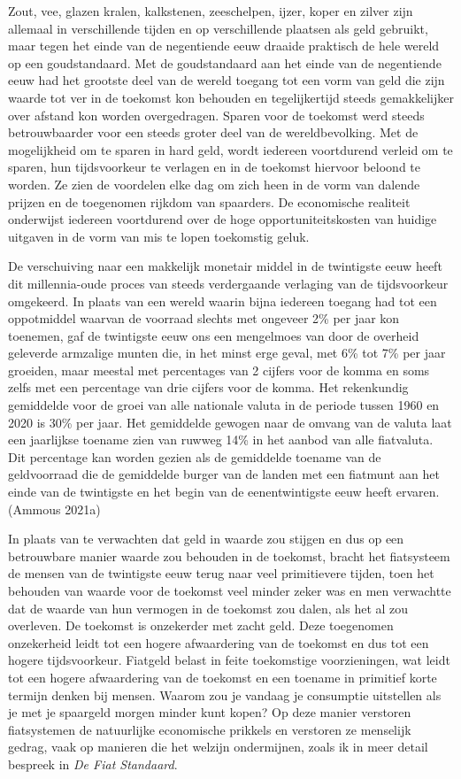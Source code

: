 \documentclass[
  a5paper,
  smalldemyvopaper,11pt,twoside,onecolumn,openright,extrafontsizes,
hidelinks]{memoir}
\begin{document}
Zout, vee, glazen kralen, kalkstenen, zeeschelpen, ijzer, koper en
zilver zijn allemaal in verschillende tijden en op verschillende
plaatsen als geld gebruikt, maar tegen het einde van de negentiende eeuw
draaide praktisch de hele wereld op een goudstandaard. Met de
goudstandaard aan het einde van de negentiende eeuw had het grootste
deel van de wereld toegang tot een vorm van geld die zijn waarde tot ver
in de toekomst kon behouden en tegelijkertijd steeds gemakkelijker over
afstand kon worden overgedragen. Sparen voor de toekomst werd steeds
betrouwbaarder voor een steeds groter deel van de wereldbevolking. Met
de mogelijkheid om te sparen in hard geld, wordt iedereen voortdurend
verleid om te sparen, hun tijdsvoorkeur te verlagen en in de toekomst
hiervoor beloond te worden. Ze zien de voordelen elke dag om zich heen
in de vorm van dalende prijzen en de toegenomen rijkdom van spaarders.
De economische realiteit onderwijst iedereen voortdurend over de hoge
opportuniteitskosten van huidige uitgaven in de vorm van mis te lopen
toekomstig geluk.

De verschuiving naar een makkelijk monetair middel in de twintigste eeuw
heeft dit millennia-oude proces van steeds verdergaande verlaging van de
tijdsvoorkeur omgekeerd. In plaats van een wereld waarin bijna iedereen
toegang had tot een oppotmiddel waarvan de voorraad slechts met ongeveer
2\% per jaar kon toenemen, gaf de twintigste eeuw ons een mengelmoes van
door de overheid geleverde armzalige munten die, in het minst erge
geval, met 6\% tot 7\% per jaar groeiden, maar meestal met percentages
van 2 cijfers voor de komma en soms zelfs met een percentage van drie
cijfers voor de komma. Het rekenkundig gemiddelde voor de groei van alle
nationale valuta in de periode tussen 1960 en 2020 is 30\% per jaar. Het
gemiddelde gewogen naar de omvang van de valuta laat een jaarlijkse
toename zien van ruwweg 14\% in het aanbod van alle fiatvaluta. Dit
percentage kan worden gezien als de gemiddelde toename van de
geldvoorraad die de gemiddelde burger van de landen met een fiatmunt aan
het einde van de twintigste en het begin van de eenentwintigste eeuw
heeft ervaren. (Ammous 2021a)

In plaats van te verwachten dat geld in waarde zou stijgen en dus op een
betrouwbare manier waarde zou behouden in de toekomst, bracht het
fiatsysteem de mensen van de twintigste eeuw terug naar veel
primitievere tijden, toen het behouden van waarde voor de toekomst veel
minder zeker was en men verwachtte dat de waarde van hun vermogen in de
toekomst zou dalen, als het al zou overleven. De toekomst is onzekerder
met zacht geld. Deze toegenomen onzekerheid leidt tot een hogere
afwaardering van de toekomst en dus tot een hogere tijdsvoorkeur.
Fiatgeld belast in feite toekomstige voorzieningen, wat leidt tot een
hogere afwaardering van de toekomst en een toename in primitief korte
termijn denken bij mensen. Waarom zou je vandaag je consumptie
uitstellen als je met je spaargeld morgen minder kunt kopen? Op deze
manier verstoren fiatsystemen de natuurlijke economische prikkels en
verstoren ze menselijk gedrag, vaak op manieren die het welzijn
ondermijnen, zoals ik in meer detail bespreek in \emph{De Fiat
Standaard}.
\end{document}
